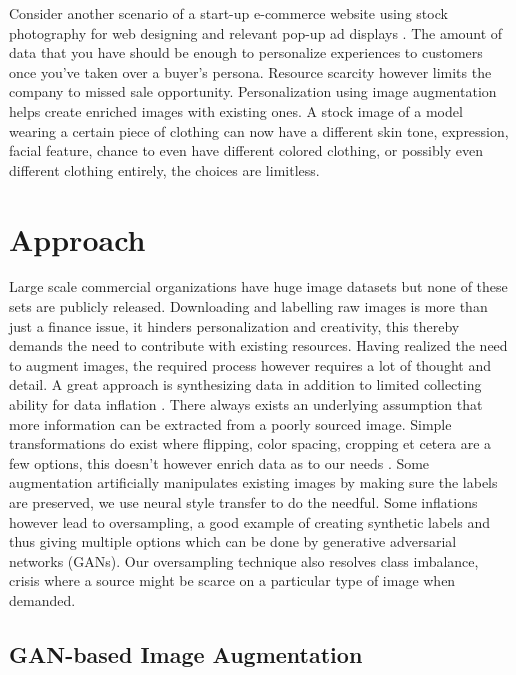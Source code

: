 \documentclass[preprint,12pt]{elsarticle}
\begin{document}
Consider another scenario of a start-up e-commerce website using stock photography for web designing and relevant pop-up ad displays \cite{Ralitsa2019}. The amount of data that you have should be enough to personalize experiences to customers once you've taken over a buyer’s persona. Resource scarcity however limits the company to missed sale opportunity. Personalization using image augmentation helps create enriched images with existing ones. A stock image of a model wearing a certain piece of clothing can now have a different skin tone, expression, facial feature, chance to even have different colored clothing, or possibly even different clothing entirely, the choices are limitless.

\section{Approach}
\label{S:4}
Large scale commercial organizations have huge image datasets but none of these sets are publicly released. Downloading and labelling raw images is more than just a finance issue, it hinders personalization and creativity, this thereby demands the need to contribute with existing resources. Having realized the need to augment images, the required process however requires a lot of thought and detail. A great approach is synthesizing data in addition to limited collecting ability for data inflation \cite{book}.
There always exists an underlying assumption that more information can be extracted from a poorly sourced image. Simple transformations do exist where flipping, color spacing, cropping et cetera are a few options, this doesn’t however enrich data as to our needs \cite{Shorten2019ASO}. Some augmentation artificially manipulates existing images by making sure the labels are preserved, we use neural style transfer to do the needful. Some inflations however lead to oversampling, a good example of creating synthetic labels and thus giving multiple options which can be done by generative adversarial networks (GANs). Our oversampling technique also resolves class imbalance, crisis where a source might be scarce on a particular type of image when demanded. 

\subsection{GAN-based Image Augmentation}
\end{document}
